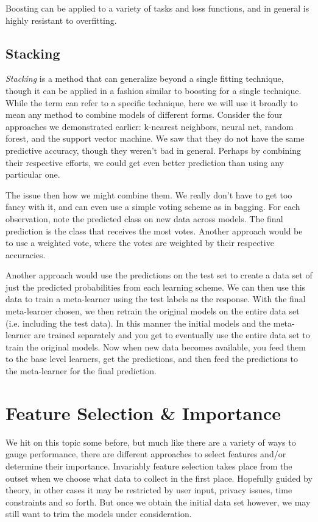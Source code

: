 \documentclass[english,nohyper,titlepage]{tufte-handout}\usepackage{knitr}
\begin{document}
\medskip
Boosting can be applied to a variety of tasks and loss functions, and in general is highly resistant to overfitting.

\subsection{Stacking}
\emph{Stacking} is a method that can generalize beyond a single fitting technique, though it can be applied in a fashion similar to boosting for a single technique.  While the term can refer to a specific technique, here we will use it broadly to mean any method to combine models of different forms. Consider the four approaches we demonstrated earlier: k-nearest neighbors, neural net, random forest, and the support vector machine.  We saw that they do not have the same predictive accuracy, though they weren't bad in general. Perhaps by combining their respective efforts, we could get even better prediction than using any particular one. 

The issue then how we might combine them.  We really don't have to get too fancy with it, and can even use a simple voting scheme as in bagging. For each observation, note the predicted class on new data across models. The final prediction is the class that receives the most votes.  Another approach would be to use a weighted vote, where the votes are weighted by their respective accuracies.  

Another approach would use the predictions on the test set to create a data set of just the predicted probabilities from each learning scheme. We can then use this data to train a meta-learner using the test labels as the response.  With the final meta-learner chosen, we then retrain the original models on the entire data set (i.e. including the test data).  In this manner the initial models and the meta-learner are trained separately and you get to eventually use the entire data set to train the original models.  Now when new data becomes available, you feed them to the base level learners, get the predictions, and then feed the predictions to the meta-learner for the final prediction.

\section{Feature Selection \& Importance}
We hit on this topic some before, but much like there are a variety of ways to gauge performance, there are different approaches to select features and/or determine their importance. Invariably feature selection takes place from the outset when we choose what data to collect in the first place.  Hopefully guided by theory, in other cases it may be restricted by user input, privacy issues, time constraints and so forth.  But once we obtain the initial data set however, we may still want to trim the models under consideration.
\end{document}

